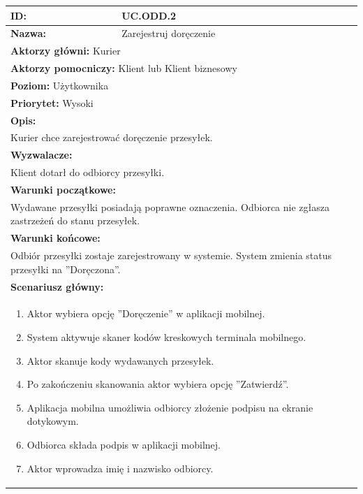\begin{center}
\begin{longtable}[h]{|p{1.6cm}|p{13.5cm}|}
\hline
\textbf{ID:} & UC.ODD.2 \\ \hline
\textbf{Nazwa:} & Zarejestruj doręczenie \\ \hline
\multicolumn{2}{|p{15.1cm}|}{\textbf{Aktorzy główni:} Kurier} \\
\multicolumn{2}{|p{15.1cm}|}{\textbf{Aktorzy pomocniczy:} Klient lub Klient biznesowy} \\
\multicolumn{2}{|p{15.1cm}|}{\textbf{Poziom:} Użytkownika} \\
\multicolumn{2}{|p{15.1cm}|}{\textbf{Priorytet:} Wysoki} \\
\hline
\multicolumn{2}{|p{15.1cm}|}{\textbf{Opis:}} \\
\multicolumn{2}{|p{15.1cm}|}{
Kurier chce zarejestrować doręczenie przesyłek.
} \\ \hline
\multicolumn{2}{|p{15.1cm}|}{\textbf{Wyzwalacze:}} \\
\multicolumn{2}{|p{15.1cm}|}{
Klient dotarł do odbiorcy przesyłki.
} \\ \hline
\multicolumn{2}{|p{15.1cm}|}{\textbf{Warunki początkowe:}} \\
\multicolumn{2}{|p{15.1cm}|}{
Wydawane przesyłki posiadają poprawne oznaczenia. Odbiorca nie zgłasza zastrzeżeń do stanu przesyłek.
} \\ \hline
\multicolumn{2}{|p{15.1cm}|}{\textbf{Warunki końcowe:}} \\
\multicolumn{2}{|p{15.1cm}|}{
Odbiór przesyłki zostaje zarejestrowany w systemie. System zmienia status przesyłki na ''Doręczona''.
} \\ \hline
\multicolumn{2}{|p{15.1cm}|}{\textbf{Scenariusz główny:}} \\
\multicolumn{2}{|p{15.1cm}|}{
\begin{enumerate}
\item Aktor wybiera opcję ''Doręczenie'' w aplikacji mobilnej.
\item System aktywuje skaner kodów kreskowych terminala mobilnego.
\item Aktor skanuje kody wydawanych przesyłek.
\item Po zakończeniu skanowania aktor wybiera opcję ''Zatwierdź''.
\item Aplikacja mobilna umożliwia odbiorcy złożenie podpisu na ekranie dotykowym.
\item Odbiorca składa podpis w aplikacji mobilnej.
\item Aktor wprowadza imię i nazwisko odbiorcy.

\end{enumerate}}
\end{longtable}
\end{center}
